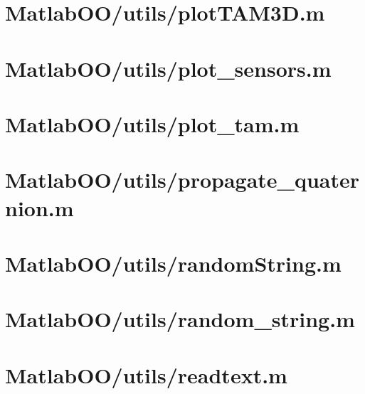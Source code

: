 \pagebreak
\section{MatlabOO/utils/plotTAM3D.m}\label{code:MatlabOO/utils/plotTAM3D.m}


\pagebreak
\section{MatlabOO/utils/plot\_sensors.m}\label{code:MatlabOO/utils/plot_sensors.m}


\pagebreak
\section{MatlabOO/utils/plot\_tam.m}\label{code:MatlabOO/utils/plot_tam.m}


\pagebreak
\section{MatlabOO/utils/propagate\_quaternion.m}\label{code:MatlabOO/utils/propagate_quaternion.m}


\pagebreak
\section{MatlabOO/utils/randomString.m}\label{code:MatlabOO/utils/randomString.m}


\pagebreak
\section{MatlabOO/utils/random\_string.m}\label{code:MatlabOO/utils/random_string.m}


\pagebreak
\section{MatlabOO/utils/readtext.m}\label{code:MatlabOO/utils/readtext.m}



